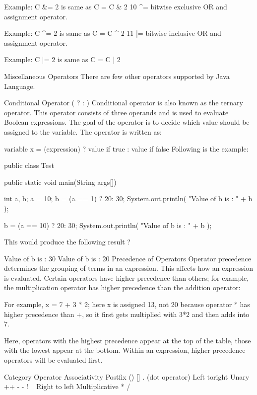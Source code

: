 Example: C &= 2 is same as C = C & 2 10 ^= bitwise exclusive OR and assignment operator.

Example: C ^= 2 is same as C = C ^ 2 11 |= bitwise inclusive OR and assignment operator.

Example: C |= 2 is same as C = C | 2

Miscellaneous Operators
There are few other operators supported by Java Language.

Conditional Operator ( ? : ) Conditional operator is also known as the ternary operator. This operator consists of three operands and is used to evaluate Boolean expressions. The goal of the operator is to decide which value should be assigned to the variable. The operator is written as:

variable x = (expression) ? value if true : value if false
Following is the example:

public class Test {

   public static void main(String args[]){
      int a, b;
      a = 10;
      b = (a == 1) ? 20: 30;
      System.out.println( "Value of b is : " +  b );

      b = (a == 10) ? 20: 30;
      System.out.println( "Value of b is : " + b );
   }
}
This would produce the following result ?

Value of b is : 30
Value of b is : 20
Precedence of Operators
Operator precedence determines the grouping of terms in an expression. This affects how an expression is evaluated. Certain operators have higher precedence than others; for example, the multiplication operator has higher precedence than the addition operator:

For example, x = 7 + 3 * 2; here x is assigned 13, not 20 because operator * has higher precedence than +, so it first gets multiplied with 3*2 and then adds into 7.

Here, operators with the highest precedence appear at the top of the table, those with the lowest appear at the bottom. Within an expression, higher precedence operators will be evaluated first.

Category Operator Associativity Postfix () [] . (dot operator) Left toright Unary ++ - - ! ~ Right to left Multiplicative * / %

